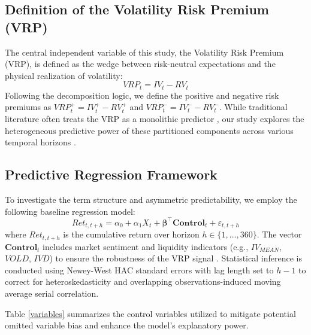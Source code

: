 \documentclass[a4paper, 12pt]{article}    %
\begin{document}
\subsection{Definition of the Volatility Risk Premium (VRP)}
The central independent variable of this study, the Volatility Risk Premium (VRP), is defined as the wedge between risk-neutral expectations and the physical realization of volatility:
\begin{equation}
VRP_t = IV_t - RV_t
\end{equation}
Following the decomposition logic, we define the positive and negative risk premiums as $VRP^+_t = IV^+_t - RV^+_t$ and $VRP^-_t = IV^-_t - RV^-_t$. While traditional literature often treats the VRP as a monolithic predictor {\citep{bollerslev2009}}, our study explores the heterogeneous predictive power of these partitioned components across various temporal horizons {\citep{bollerslev2014, qiao2024variance}}.

\subsection{Predictive Regression Framework}
To investigate the term structure and asymmetric predictability, we employ the following baseline regression model:
\begin{equation} \label{base}
Ret_{t,t+h} = \alpha_0 + \alpha_1 X_{t} + \boldsymbol{\beta}^\top \mathbf{Control}_{t} + \varepsilon_{t,t+h}
\end{equation}
where $Ret_{t,t+h}$ is the cumulative return over horizon $h \in \{1, \dots, 360\}$. The vector $\mathbf{Control}_{t}$ includes market sentiment and liquidity indicators (e.g., $IV_{MEAN}$, $VOLD$, $IVD$) to ensure the robustness of the VRP signal {\citep{dai2020efficient, zheng2013volatility}}. 
Statistical inference is conducted using Newey-West HAC standard errors \citep{newey1987simple} with lag length set to $h-1$ to correct for heteroskedasticity and overlapping observations-induced moving average serial correlation.

Table \ref{variables} summarizes the control variables utilized to mitigate potential omitted variable bias and enhance the model's explanatory power.
\end{document}
